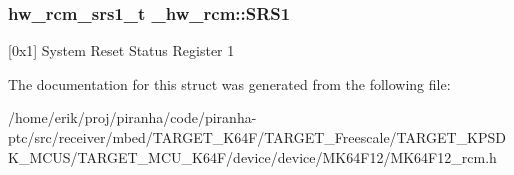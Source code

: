 \subsubsection[{\texorpdfstring{S\+R\+S1}{SRS1}}]{ {\bf hw\+\_\+rcm\+\_\+srs1\+\_\+t} \+\_\+hw\+\_\+rcm\+::\+S\+R\+S1}\hypertarget{struct__hw__rcm_a5e0efd03b27f711dab85e4f3f18c4272}{}\label{struct__hw__rcm_a5e0efd03b27f711dab85e4f3f18c4272}
\mbox{[}0x1\mbox{]} System Reset Status Register 1 

The documentation for this struct was generated from the following file\+:\begin{DoxyCompactItemize}
\item 
/home/erik/proj/piranha/code/piranha-\/ptc/src/receiver/mbed/\+T\+A\+R\+G\+E\+T\+\_\+\+K64\+F/\+T\+A\+R\+G\+E\+T\+\_\+\+Freescale/\+T\+A\+R\+G\+E\+T\+\_\+\+K\+P\+S\+D\+K\+\_\+\+M\+C\+U\+S/\+T\+A\+R\+G\+E\+T\+\_\+\+M\+C\+U\+\_\+\+K64\+F/device/device/\+M\+K64\+F12/M\+K64\+F12\+\_\+rcm.\+h\end{DoxyCompactItemize}
